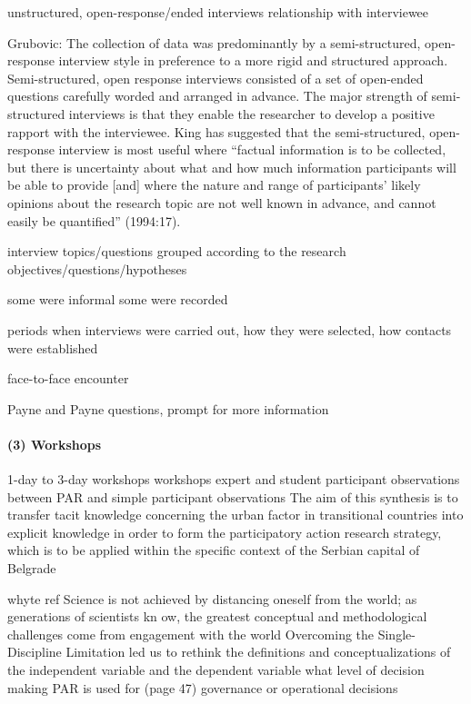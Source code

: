 \documentclass[11pt]{report}
\begin{document}
unstructured, open-response/ended interviews
relationship with interviewee

Grubovic: The  collection  of  data  was  predominantly  by  a  semi-structured,  open-response interview  style  in  preference  to  a  more  rigid  and  structured  approach.  Semi-structured,  open  response  interviews  consisted  of  a  set  of  open-ended  questions carefully  worded  and  arranged  in  advance.  The  major  strength  of  semi-structured interviews is that they enable the researcher to develop a positive rapport with the interviewee. King has suggested that the semi-structured, open-response interview is most  useful  where  “factual  information  is  to  be  collected,  but  there  is uncertainty 
about  what  and  how  much  information  participants  will  be  able  to  provide  [and] where the nature and range of participants’ likely opinions about the research topic are  not  well  known  in  advance,  and  cannot easily  be  quantified”  (1994:17).

interview topics/questions grouped according to the research objectives/questions/hypotheses

some were informal some were recorded

periods when interviews were carried out, how they were selected, how contacts were established

face-to-face encounter

Payne and Payne
questions, prompt for more information


\paragraph{(3) Workshops}

1-day to 3-day workshops workshops
expert and student
participant observations
between PAR and simple participant observations
The aim of this synthesis is to transfer tacit knowledge concerning the urban factor in transitional countries into explicit knowledge in order to form the participatory action research strategy, which is to be applied within the specific context of the Serbian capital of Belgrade

whyte ref
Science is not achieved  by distancing oneself from  the world; as  generations of scientists  kn ow,  the  greatest conceptual and methodological challenges come from  engagement with the  world
Overcoming the Single-Discipline Limitation
led us to rethink the definitions and conceptualizations of the independent variable and the dependent variable 
what level of decision making PAR is used for (page 47) governance or operational decisions
\end{document}
